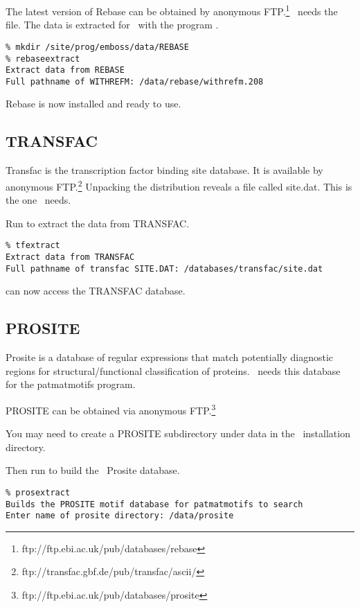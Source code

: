 \documentclass{report}
\begin{document}
The latest version of Rebase can be obtained by anonymous
FTP.\footnote{ftp://ftp.ebi.ac.uk/pub/databases/rebase} \EMBOSS\ needs
the  file. The data is extracted for \EMBOSS\ with
the program .

\begin{verbatim}
% mkdir /site/prog/emboss/data/REBASE
% rebaseextract
Extract data from REBASE
Full pathname of WITHREFM: /data/rebase/withrefm.208
\end{verbatim}

Rebase is now installed and ready to use.

\subsection{TRANSFAC}

Transfac is the transcription factor binding site database. It is
available by anonymous
FTP.\footnote{ftp://transfac.gbf.de/pub/transfac/ascii/} Unpacking the
distribution reveals a file called site.dat. This is the one \EMBOSS\
needs.

Run  to extract the data from TRANSFAC.

\begin{verbatim}
% tfextract
Extract data from TRANSFAC
Full pathname of transfac SITE.DAT: /databases/transfac/site.dat
\end{verbatim}

 can now access the TRANSFAC database.

\subsection{PROSITE}

Prosite is a database of regular expressions that match potentially
diagnostic regions for structural/functional classification of
proteins. \EMBOSS\ needs this database for the patmatmotifs program.

PROSITE can be obtained via anonymous
FTP.\footnote{ftp://ftp.ebi.ac.uk/pub/databases/prosite}

You may need to create a PROSITE subdirectory under data in the
\EMBOSS\ installation directory.

Then run  to build the \EMBOSS\ Prosite database.

\begin{verbatim}
% prosextract
Builds the PROSITE motif database for patmatmotifs to search
Enter name of prosite directory: /data/prosite
\end{verbatim}
\end{document}
